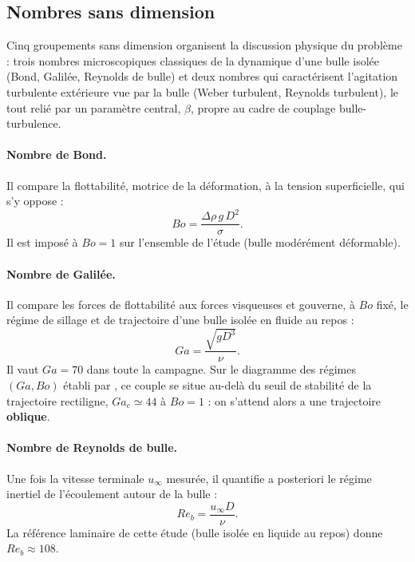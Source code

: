 \subsection{Nombres sans dimension}
\label{sec:cadre:nombres}

Cinq groupements sans dimension organisent la discussion physique du
problème : trois nombres microscopiques classiques de la dynamique d'une
bulle isolée (Bond, Galilée, Reynolds de bulle) et deux nombres qui
caractérisent l'agitation turbulente extérieure vue par la bulle (Weber
turbulent, Reynolds turbulent), le tout relié par un paramètre central,
$\beta$, propre au cadre de couplage bulle-turbulence.

\paragraph{Nombre de Bond.} Il compare la flottabilité, motrice de la
déformation, à la tension superficielle, qui s'y oppose :
\begin{equation}
    Bo = \frac{\Delta\rho\, g\, D^2}{\sigma}.
    \label{eq:bond}
\end{equation}
Il est imposé à $Bo=1$ sur l'ensemble de l'étude (bulle modérément
déformable).

\paragraph{Nombre de Galilée.} Il compare les forces de flottabilité aux
forces visqueuses et gouverne, à $Bo$ fixé, le régime de sillage et de
trajectoire d'une bulle isolée en fluide au repos :
\begin{equation}
    Ga = \frac{\sqrt{g D^3}}{\nu}.
    \label{eq:galilee}
\end{equation}
Il vaut $Ga=70$ dans toute la campagne. Sur le diagramme des régimes
$(Ga,Bo)$ établi par \cite{canolozano2016}, ce couple se situe au-delà du
seuil de stabilité de la trajectoire rectiligne, $Ga_c\simeq44$ à $Bo=1$ : on s'attend alors a
une trajectoire \textbf{oblique}.

\paragraph{Nombre de Reynolds de bulle.} Une fois la vitesse terminale
$u_\infty$ mesurée, il quantifie a posteriori le régime inertiel de
l'écoulement autour de la bulle :
\begin{equation}
    Re_b = \frac{u_\infty D}{\nu}.
    \label{eq:reb}
\end{equation}
La référence laminaire de cette étude (bulle isolée en liquide au repos)
donne $Re_b \approx 108$.

